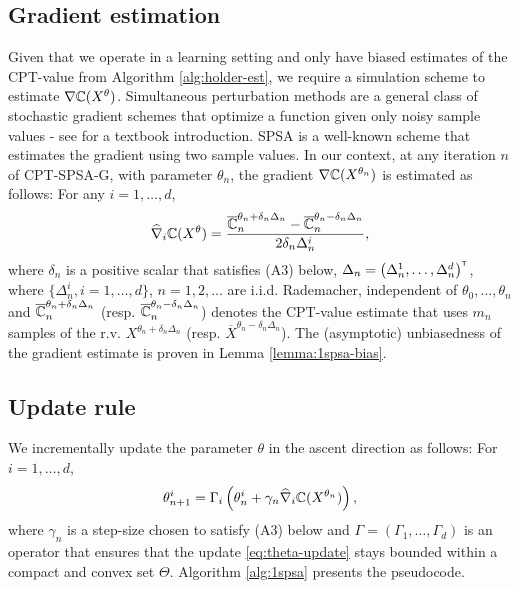 \subsection{Gradient estimation} 
Given that we operate in a learning setting and only have biased estimates of the CPT-value from Algorithm \ref{alg:holder-est}, we require a simulation scheme to estimate $\nabla \mathbb{C}(X^\theta)$.  
Simultaneous perturbation methods are a general class of stochastic gradient schemes that optimize a function given only noisy sample values - see \cite{Bhatnagar13SR} for a textbook introduction. SPSA is a well-known scheme that estimates the gradient using two sample values. In our context, at any iteration $n$ of CPT-SPSA-G, with parameter $\theta_n$, the gradient $\nabla \mathbb{C}(X^{\theta_n})$ is estimated as follows: For any  $i=1,\ldots,d$,
\begin{align}
\widehat \nabla_{i} \mathbb{C}(X^\theta) = \dfrac{\overline {\mathbb{C}}_n^{\theta_n+\delta_n \Delta_n} - \overline {\mathbb{C}}_n^{\theta_n-\delta_n \Delta_n}}{2 \delta_n \Delta_n^{i}},\label{eq:grad-est-spsa}
\end{align}
where $\delta_n$ is a positive scalar that satisfies (A3) below, $\Delta_n = \left( \Delta_n^{1},\ldots,\Delta_n^{d}\right)^\mathsf{\scriptscriptstyle T}$, where $\{\Delta_n^{i}, i=1,\ldots,d\}$, $n=1,2,\ldots$ are i.i.d. Rademacher, independent of $\theta_0,\ldots,\theta_n$ and $\overline {\mathbb{C}}_n^{\theta_n+\delta_n \Delta_n}$ (resp. $\overline {\mathbb{C}}_n^{\theta_n-\delta_n \Delta_n}$) denotes the CPT-value estimate that uses $m_n$ samples of the r.v. $X^{\theta_n+\delta_n \Delta_n}$ (resp. $\overline X^{\theta_n-\delta_n \Delta_n}$).
The (asymptotic) unbiasedness of the gradient estimate is proven in Lemma \ref{lemma:1spsa-bias}.



\subsection{Update rule} We incrementally update the parameter $\theta$ in the ascent direction as follows: For $i=1,\ldots,d$,
\begin{align}
\theta^{i}_{n+1} = \Gamma_{i}\left(\theta^{i}_n + \gamma_n  \widehat \nabla_{i} \mathbb{C}(X^{\theta_n})\right),
\label{eq:theta-update}
\end{align}
where  $\gamma_n$ is a step-size chosen to satisfy (A3) below and
$\Gamma=\left(\Gamma_{1},\ldots,\Gamma_{d}\right)$ is an operator that ensures that the update \eqref{eq:theta-update} stays bounded within a compact and convex set $\Theta$. 
Algorithm \ref{alg:1spsa}  presents the pseudocode.  



